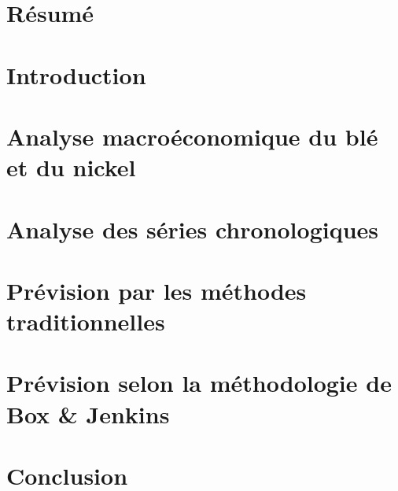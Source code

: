 \documentclass[11pt,a4paper]{article}
\begin{document}
\clearpage
\setcounter{tocdepth}{1}
\renewcommand\contentsname{Sommaire}
\tableofcontents
\newpage
\section*{Résumé}
\section*{Introduction}
\section{Analyse macroéconomique du blé et du nickel}
\section{Analyse des séries chronologiques}
\section{Prévision par les méthodes traditionnelles}
\section{Prévision selon la méthodologie de Box \& Jenkins}
\section*{Conclusion}
\end{document}
